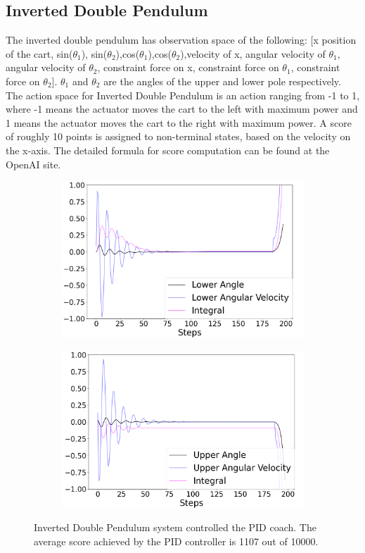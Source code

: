 \documentclass[AMS,STIX1COL]{WileyNJD-v2}
\begin{document}
\subsection{Inverted Double Pendulum}
The inverted double pendulum has observation space of the following: [x position of the cart, sin($\theta_1$), sin($\theta_2$),cos($\theta_1$),cos($\theta_2$),velocity of x, angular velocity of $\theta_1$, angular velocity of $\theta_2$, constraint force on x, constraint force on $\theta_1$, constraint force on $\theta_2$]. $\theta_1$ and $\theta_2$ are the angles of the upper and lower pole respectively. The action space for Inverted Double Pendulum is an action ranging from -1 to 1, where -1 means the actuator moves the cart to the left with maximum power and 1 means the actuator moves the cart to the right with maximum power. A score of roughly 10 points is assigned to non-terminal states, based on the velocity on the x-axis. The detailed formula for score computation can be found at the OpenAI site.

\begin{figure}
\centering
\begin{subfigure}{0.3\textwidth}
\centering
\includegraphics[width=\linewidth]{double_PID.png}
\end{subfigure}
\begin{subfigure}{0.3\textwidth}
\centering
\includegraphics[width=\linewidth]{double_PID_upper.png}
\end{subfigure}
\caption{Inverted Double Pendulum system controlled the PID coach. The average score achieved by the PID controller is 1107 out of 10000. }
\label{fig:double_pid}
\end{figure}
\end{document}
